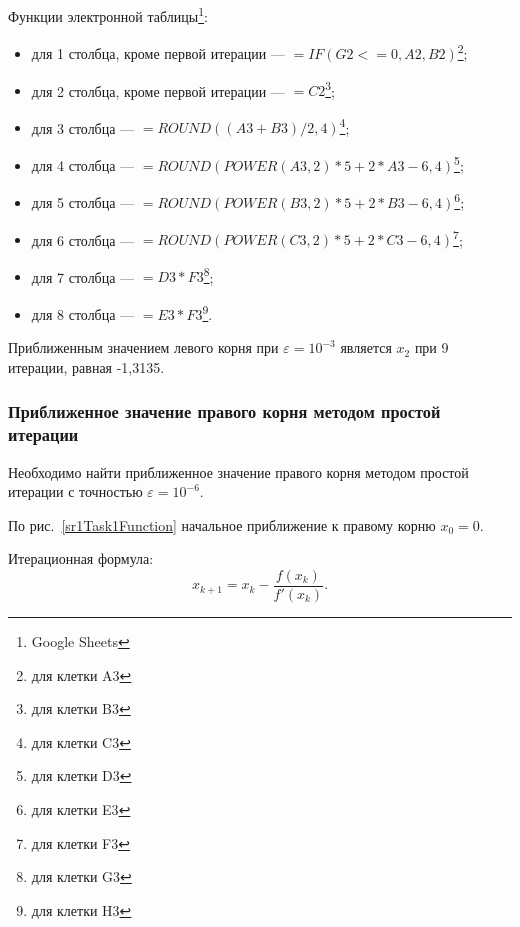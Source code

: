 \documentclass[10pt, a4paper, titlepage]{article}
\begin{document}
Функции электронной таблицы\footnote{Google Sheets}:
\begin{itemize}
    \item для 1 столбца, кроме первой итерации --- $=IF(G2<=0, A2, B2)$\footnote{для клетки A3};
    
    \item для 2 столбца, кроме первой итерации --- $=C2$\footnote{для клетки B3};
    
    \item для 3 столбца --- $=ROUND((A3+B3)/2, 4)$\footnote{для клетки C3};
    
    \item для 4 столбца --- $=ROUND(POWER(A3, 2)*5+2*A3-6, 4)$\footnote{для клетки D3};
    
    \item для 5 столбца --- $=ROUND(POWER(B3, 2)*5+2*B3-6, 4)$\footnote{для клетки E3};
    
    \item для 6 столбца --- $=ROUND(POWER(C3, 2)*5+2*C3-6, 4)$\footnote{для клетки F3};
    
    \item для 7 столбца --- $=D3*F3$\footnote{для клетки G3};
    
    \item для 8 столбца --- $=E3*F3$\footnote{для клетки H3}.

\end{itemize}

Приближенным значением левого корня при $\varepsilon=10^{-3}$ является $x_2$ при 9 итерации, равная -1,3135.

\subsubsection*{Приближенное значение правого корня методом простой итерации}

Необходимо найти приближенное значение правого корня методом простой итерации с точностью $\varepsilon=10^{-6}$.

По рис.~\ref{sr1Task1Function} начальное приближение к правому корню $x_0=0$.

Итерационная формула: $$x_{k+1}=x_k-\frac{f(x_k)}{f'(x_k)}.$$
\end{document}

